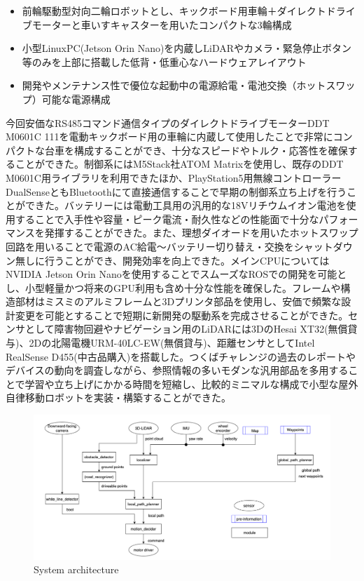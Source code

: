 \documentclass[platex,dvipdfmx]{rbproceedings}
\begin{document}
\begin{itemize}
\item 前輪駆動型対向二輪ロボットとし、キックボード用車輪＋ダイレクトドライブモーターと車いすキャスターを用いたコンパクトな3輪構成
\item 小型LinuxPC(Jetson Orin Nano)を内蔵しLiDARやカメラ・緊急停止ボタン等のみを上部に搭載した低背・低重心なハードウェアレイアウト
\item 開発やメンテナンス性で優位な起動中の電源給電・電池交換（ホットスワップ）可能な電源構成
\end{itemize}

今回安価なRS485コマンド通信タイプのダイレクトドライブモーターDDT M0601C 111\cite{ddt}を電動キックボード用の車輪に内蔵して使用したことで非常にコンパクトな台車を構成することができ、十分なスピードやトルク・応答性を確保することができた。制御系にはM5Stack社ATOM Matrix\cite{atom}を使用し、既存のDDT M0601C用ライブラリを利用できたほか、PlayStation5用無線コントローラーDualSenseともBluetoothにて直接通信することで早期の制御系立ち上げを行うことができた。バッテリーには電動工具用の汎用的な18Vリチウムイオン電池を使用することで入手性や容量・ピーク電流・耐久性などの性能面で十分なパフォーマンスを発揮することができた。また、理想ダイオード\cite{diode}を用いたホットスワップ回路を用いることで電源のAC給電～バッテリー切り替え・交換をシャットダウン無しに行うことができ、開発効率を向上できた。メインCPUについてはNVIDIA Jetson Orin Nano\cite{jetson}を使用することでスムーズなROSでの開発を可能とし、小型軽量かつ将来のGPU利用も含め十分な性能を確保した。フレームや構造部材はミスミのアルミフレームと3Dプリンタ部品を使用し、安価で頻繁な設計変更を可能とすることで短期に新開発の駆動系を完成させることができた。センサとして障害物回避やナビゲーション用のLiDARには3DのHesai XT32(無償貸与)、2Dの北陽電機URM-40LC-EW(無償貸与)、距離センサとしてIntel RealSense D455(中古品購入)を搭載した。つくばチャレンジの過去のレポートやデバイスの動向を調査しながら、参照情報の多いモダンな汎用部品を多用することで学習や立ち上げにかかる時間を短縮し、比較的ミニマルな構成で小型な屋外自律移動ロボットを実装・構築することができた。

\begin{figure}[h]
  \centering
  \includegraphics[width=160mm]{./picture/system_architecture.png}
    \caption{System architecture}
  \label{fig:system_architecture}%
\end{figure}
\end{document}

